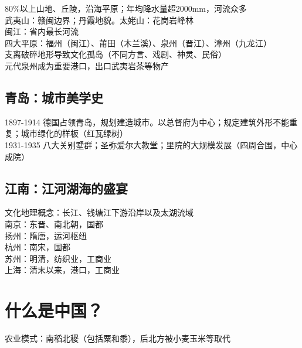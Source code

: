 80\%以上山地、丘陵，沿海平原；年均降水量超2000mm，河流众多\\
武夷山：赣闽边界；丹霞地貌。太姥山：花岗岩峰林\\
闽江：省内最长河流\\
四大平原：福州（闽江）、莆田（木兰溪）、泉州（晋江）、漳州（九龙江）\\
支离破碎地形导致文化孤岛（不同方言、戏剧、神灵、民俗）\\
元代泉州成为重要港口，出口武夷岩茶等物产

\subsection*{青岛：城市美学史}

1897-1914 德国占领青岛，规划建造城市。以总督府为中心；规定建筑外形不能重复；城市绿化的样板（红瓦绿树）\\
1931-1935 八大关别墅群；圣弥爱尔大教堂；里院的大规模发展（四周合围，中心成院）

\subsection*{江南：江河湖海的盛宴}
文化地理概念：长江、钱塘江下游沿岸以及太湖流域\\
南京：东晋、南北朝，国都\\
扬州：隋唐，运河枢纽\\
杭州：南宋，国都\\
苏州：明清，纺织业，工商业\\
上海：清末以来，港口，工商业

\section*{什么是中国？}
农业模式：南稻北稷（包括粟和黍），后北方被小麦玉米等取代